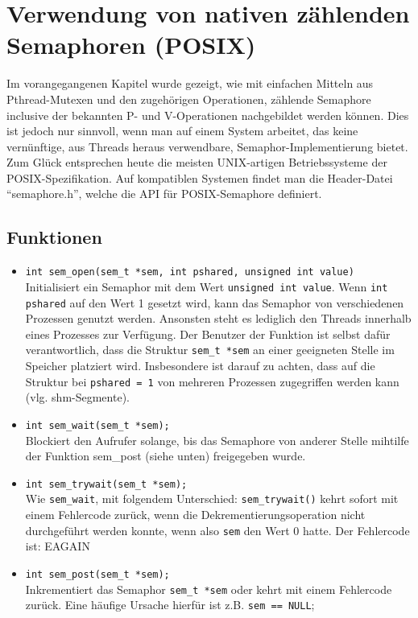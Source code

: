\documentclass[11pt,a4paper]{article}
\begin{document}
\section{Verwendung von nativen zählenden Semaphoren (POSIX)}
Im vorangegangenen Kapitel wurde gezeigt, wie mit einfachen Mitteln
aus Pthread-Mutexen und den zugehörigen Operationen, zählende Semaphore
inclusive der bekannten P- und V-Operationen nachgebildet werden können.
Dies ist jedoch nur sinnvoll, wenn man auf einem System arbeitet, das
keine vernünftige, aus Threads heraus verwendbare, Semaphor-Implementierung
bietet. Zum Glück entsprechen heute die meisten UNIX-artigen Betriebssysteme
der POSIX-Spezifikation. Auf kompatiblen Systemen findet man die Header-Datei
``semaphore.h'', welche die API für POSIX-Semaphore definiert.

\subsection{Funktionen}
\begin{itemize}
\item 
	\lstinline$int sem_open(sem_t *sem, int pshared, unsigned int value)$ \\
	Initialisiert ein Semaphor mit dem Wert \lstinline$unsigned int value$.
	Wenn \lstinline$int pshared$ auf den Wert 1 gesetzt wird, kann das Semaphor
	von verschiedenen Prozessen genutzt werden. Ansonsten steht es lediglich
	den Threads innerhalb eines Prozesses zur Verfügung. Der Benutzer der
	Funktion ist selbst dafür verantwortlich, dass die Struktur \lstinline$sem_t *sem$
	an einer geeigneten Stelle im Speicher platziert wird. Insbesondere ist
	darauf zu achten, dass auf die Struktur bei \lstinline$pshared = 1$ von mehreren
	Prozessen zugegriffen werden kann (vlg. shm-Segmente).

\item
	\lstinline$int sem_wait(sem_t *sem);$ \\
	Blockiert den Aufrufer solange, bis das Semaphore von anderer Stelle
	mihtilfe der Funktion sem\_post (siehe unten) freigegeben wurde.

\item	
	\lstinline$int sem_trywait(sem_t *sem);$ \\
	Wie \lstinline$sem_wait$, mit folgendem Unterschied: \lstinline$sem_trywait()$ kehrt
	sofort mit einem Fehlercode zurück, wenn die Dekrementierungsoperation nicht durchgeführt
	werden konnte, wenn also \lstinline$sem$ den Wert 0 hatte.
	Der Fehlercode ist: EAGAIN
	
\item
	\lstinline$int sem_post(sem_t *sem);$ \\
	Inkrementiert das Semaphor \lstinline$sem_t *sem$ oder kehrt mit einem Fehlercode
	zurück. Eine häufige Ursache hierfür ist z.B. \lstinline$sem == NULL$;

\end{itemize}
\end{document}
